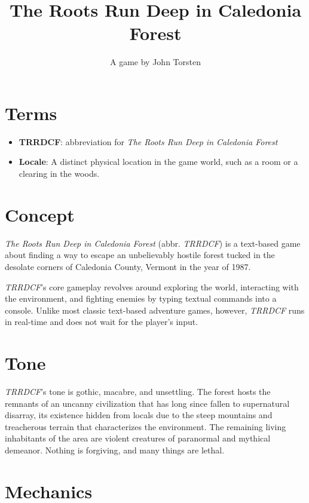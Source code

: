 \documentclass[11pt]{article}
\title{The Roots Run Deep in Caledonia Forest}
\author{A game by John Torsten}
\begin{document}
	\maketitle
	\tableofcontents
	\clearpage

	\section{Terms}
	
	\begin{itemize}
		\item \textbf{TRRDCF}: abbreviation for \textit{The Roots Run Deep in Caledonia Forest}
		\item \textbf{Locale}: A distinct physical location in the game world, such as a room or a clearing in the woods.
	\end{itemize}
	
	
	\section{Concept}
	
	\textit{The Roots Run Deep in Caledonia Forest} (abbr. \textit{TRRDCF}) is a text-based game about finding a way to escape an unbelievably hostile forest tucked in the desolate corners of Caledonia County, Vermont in the year of 1987.
	
	\textit{TRRDCF}'s core gameplay revolves around exploring the world, interacting with the environment, and fighting enemies by typing textual commands into a console. Unlike most classic text-based adventure games, however, \textit{TRRDCF} runs in real-time and does not wait for the player's input.
	
	\section{Tone}
	
	\textit{TRRDCF}'s tone is gothic, macabre, and unsettling. The forest hosts the remnants of an uncanny civilization that has long since fallen to supernatural disarray, its existence hidden from locals due to the steep mountains and treacherous terrain that characterizes the environment. The remaining living inhabitants of the area are violent creatures of paranormal and mythical demeanor. Nothing is forgiving, and many things are lethal.
	
	\section{Mechanics}
	
\end{document}
